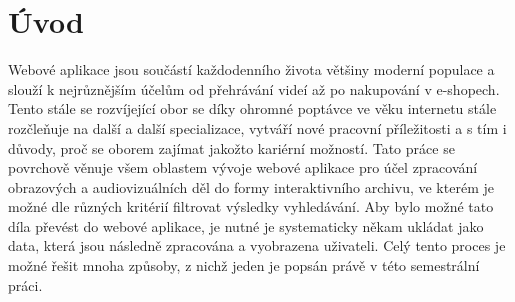 \chapter*{Úvod}
{}
Webové aplikace jsou součástí každodenního života většiny moderní populace a slouží k nejrůznějším účelům od přehrávání videí až po nakupování v e-shopech. Tento stále se rozvíjející obor se díky ohromné poptávce ve věku internetu stále rozčleňuje na další a další specializace, vytváří nové pracovní příležitosti a s tím i důvody, proč se oborem zajímat jakožto kariérní možností. Tato práce se povrchově věnuje všem oblastem vývoje webové aplikace pro účel zpracování obrazových a audiovizuálních děl do formy interaktivního archivu, ve kterém je možné dle různých kritérií filtrovat výsledky vyhledávání. Aby bylo možné tato díla převést do webové aplikace, je nutné je systematicky někam ukládat jako data, která jsou následně zpracována a vyobrazena uživateli. Celý tento proces je možné řešit mnoha způsoby, z nichž jeden je popsán právě v této semestrální práci.